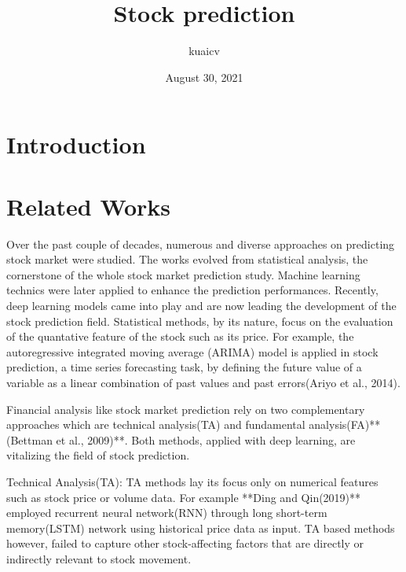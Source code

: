 \documentclass[11pt, oneside, twocolumn]{article}   	%
\title{Stock prediction}
\author{kuaicv}
\date{August 30, 2021}
\renewenvironment{abstract}
{\small
\begin{center}
\bfseries \abstractname\vspace{-.5em}\vspace{0pt}
\end{center}
\list{}{
	\setlength{\leftmargin}{.4cm}
	\setlength{\rightmargin}{\leftmargin}
}
\item\relax}
{\endlist}
\begin{document}
\maketitle


\begin{abstract}
	\blindtext
\end{abstract}

\section{Introduction}
\section{Related Works}
Over the past couple of decades, numerous and diverse approaches on predicting stock market were studied. The works evolved from statistical analysis, the cornerstone of the whole stock market prediction study. Machine learning technics were later applied to enhance the prediction performances. Recently, deep learning models came into play and are now leading the development of the stock prediction field.
Statistical methods, by its nature, focus on the evaluation of the quantative feature of the stock such as its price. For example, the autoregressive integrated moving average (ARIMA) model is applied in stock prediction, a time series forecasting task, by defining the future value of a variable as a linear combination of past values and past errors(Ariyo et al., 2014).

 Financial analysis like stock market prediction rely on two complementary approaches which are technical analysis(TA) and fundamental analysis(FA)**(Bettman et al., 2009)**. Both methods, applied with deep learning, are vitalizing the field of stock prediction.

Technical Analysis(TA): TA methods lay its focus only on numerical features such as stock price or volume data. For example **Ding and Qin(2019)** employed recurrent neural network(RNN) through long short-term memory(LSTM) network using historical price data as input. TA based methods however, failed to capture other stock-affecting factors that are directly or indirectly relevant to stock movement.
\end{document}
